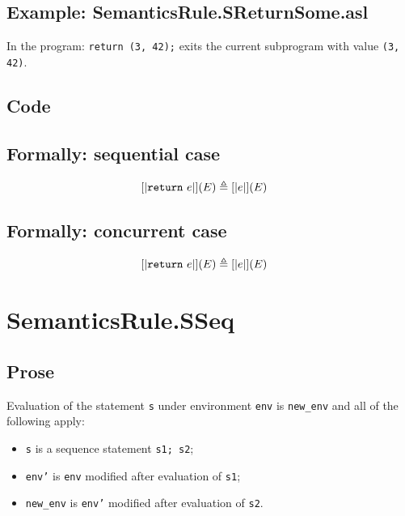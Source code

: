 \documentclass{book}
\begin{document}
    \subsection{Example: SemanticsRule.SReturnSome.asl}
    In the program:
    \texttt{return (3, 42);} exits the current subprogram with value \texttt{(3, 42)}.

  \subsection{Code}

\begin{formal}
  \subsection{Formally: sequential case}
  \begin{align}
  \left[| \mathtt{return}\ e \right|] (E) & \triangleq \left[| e \right|] (E)
  \label{eq:sem-seq-sreturn}
  \end{align} 

  \subsection{Formally: concurrent case}
  \begin{align}
  \left[| \mathtt{return}\ e \right|] (E) & \triangleq \left[| e \right|] (E)
  \label{eq:sem-conc-sreturn}
  \end{align} 
\end{formal}


\section{SemanticsRule.SSeq \label{sec:SemanticsRule.SSeq}}

  \subsection{Prose}
  Evaluation of the statement \texttt{s} under environment \texttt{env} is
\texttt{new\_env} and all of the following apply:
  \begin{itemize}
  \item \texttt{s} is a sequence statement \texttt{s1; s2};
  \item \texttt{env'} is \texttt{env} modified after evaluation of \texttt{s1};
  \item \texttt{new\_env} is \texttt{env'} modified after evaluation of \texttt{s2}.
  \end{itemize}
\end{document}
